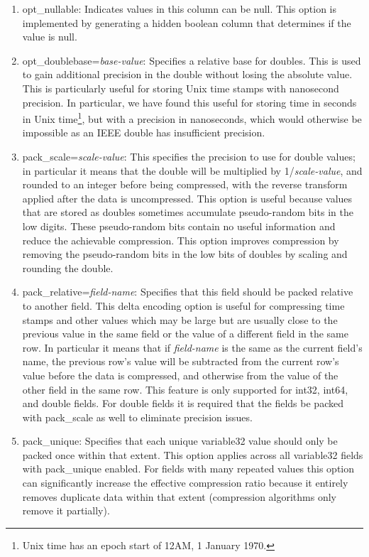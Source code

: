 \begin{enumerate}

\item opt\_nullable: Indicates values in this column can be null.
This option is
implemented by generating a hidden boolean column that determines if
the value is null.

\item opt\_doublebase={\it base-value}: Specifies a relative base for
doubles.  This is used to gain additional precision in the double
without losing the absolute value.  
This is particularly useful for storing Unix time stamps with nanosecond
precision. In particular, we have found this
useful for storing time in seconds in Unix time\footnote{Unix time has an epoch
start of 12AM, 1 January 1970.}, but with a precision in nanoseconds, which
would otherwise be impossible as an IEEE double has insufficient
precision.

\item pack\_scale={\it scale-value}: This specifies the precision to use for
double values; in particular it means that the double will be
multiplied by 1/{\it scale-value}, and rounded to an integer before
being compressed, with the reverse transform applied after the data is
uncompressed.  This option is useful because values that are stored as
doubles sometimes accumulate pseudo-random bits in the low
digits.  These pseudo-random bits contain no useful information and
reduce the achievable compression.
This option improves compression by removing the pseudo-random bits in the low 
bits of doubles by scaling and rounding the double.  

\item pack\_relative={\it field-name}: Specifies that this field
should be packed relative to another field.  This delta encoding
option is useful for compressing time stamps and other values which
may be large but are usually close to the previous value in the same
field or the value of a different field in the same row.  In
particular it means that if {\it field-name} is the same as the
current field's name, the previous row's value will be subtracted from
the current row's value before the data is compressed, and otherwise
from the value of the other field in the same row.  This feature is
only supported for int32, int64, and double fields.  For double fields
it is required that the fields be packed with pack\_scale as well to
eliminate precision issues.

\item pack\_unique: Specifies that each unique variable32 value
should only be packed once within that extent.  This option applies across all variable32
fields with pack\_unique enabled.  For fields with many repeated
values this option can significantly increase the effective
compression ratio because it entirely removes duplicate data within that extent
(compression algorithms only remove it partially).

\end{enumerate}

